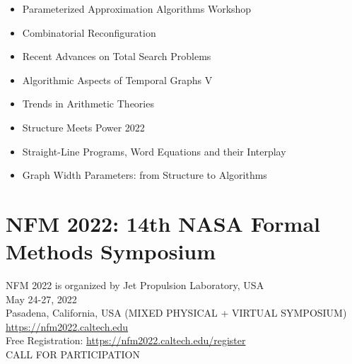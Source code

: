 \documentclass[prodmode,acmtecs]{acmsmall} %
\begin{document}
\begin{itemize}
\begin{itemize}\item  Parameterized Approximation Algorithms Workshop 
\item  Combinatorial Reconfiguration 
\item  Recent Advances on Total Search Problems 
\item  Algorithmic Aspects of Temporal Graphs V 
\item  Trends in Arithmetic Theories 
\item  Structure Meets Power 2022 
\item  Straight-Line Programs, Word Equations and their Interplay 
\item  Graph Width Parameters: from Structure to Algorithms
\end{itemize} 
\end{itemize}\section{NFM 2022: 14th NASA Formal Methods Symposium }\label{NFM2022}  NFM 2022 is organized by Jet Propulsion Laboratory, USA \\ 
  May 24-27, 2022\\ 
  Pasadena, California, USA (MIXED PHYSICAL + VIRTUAL SYMPOSIUM)\\ 
  \href{https://nfm2022.caltech.edu}{https://nfm2022.caltech.edu}\\ 
  Free Registration: \href{https://nfm2022.caltech.edu/register}{https://nfm2022.caltech.edu/register}\\ 
CALL FOR PARTICIPATION 
\end{document}
